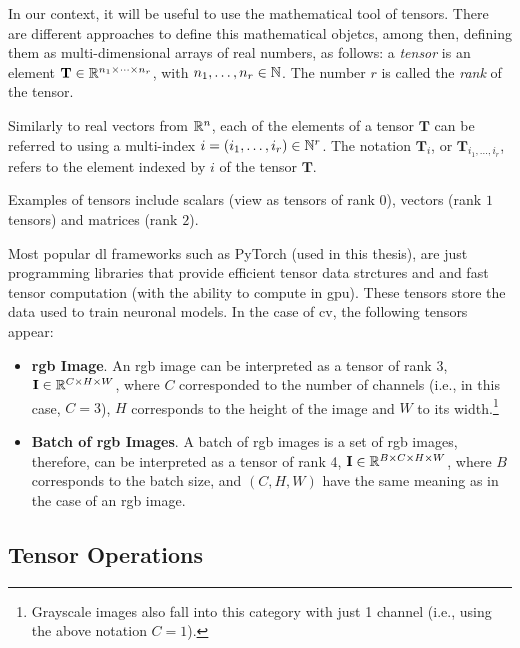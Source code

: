 In our context, it will be useful to use the mathematical tool of
tensors. There are different approaches to define this mathematical objetcs,
among then, defining them as multi-dimensional arrays of real numbers, as
follows: a \emph{tensor} is an element
\(\mathbf{T} \in \mathbb{R}^{n_1 \times \cdots \times n_r}\), with
\(n_1, \ldots, n_r \in \mathbb{N}\). The number \(r\) is called the \emph{rank} of the
tensor.

Similarly to real vectors from \(\mathbb{R}^n\), each of the elements of a tensor
\(\mathbf{T}\) can be referred to using a multi-index
\(i = (i_1, \ldots, i_r) \in \mathbb{N}^r\). The notation \(\mathbf{T}_i\), or
\(\mathbf{T}_{i_1, \ldots, i_r}\), refers to the element indexed by \(i\) of
the tensor \(\mathbf{T}\).

\begin{exampleBox}
  Examples of tensors include scalars (view as tensors of rank \(0\)), vectors
  (rank \(1\) tensors) and matrices (rank \(2\)).
\end{exampleBox}

Most popular \gls{dl} frameworks such as PyTorch (used in this thesis), are
just programming libraries that provide efficient tensor data strctures and and
fast tensor computation (with the ability to compute in \gls{gpu}). These
tensors store the data used to train neuronal models. In the case of \gls{cv},
the following tensors appear:
\begin{itemize}
  \item \textbf{\acs*{rgb} Image}. An \acs{rgb} image can be interpreted as a
  tensor of rank 3, \(\mathbf{I} \in \mathbb{R}^{C \times H \times W}\), where \(C\)
  corresponded to the number of channels (i.e., in this case, \(C = 3\)), \(H\)
  corresponds to the height of the image and \(W\) to its
  width.\footnote{Grayscale images also fall into this category with just 1
    channel (i.e., using the above notation \(C = 1\)).}
  \item \textbf{Batch of \acs*{rgb} Images}. A batch of \acs{rgb} images is a
  set of \acs{rgb} images, therefore, can be interpreted as a tensor of rank 4,
  \(\mathbf{I} \in \mathbb{R}^{B \times C \times H \times W}\), where \(B\) corresponds
  to the batch size, and \((C, H, W)\) have the same meaning as in the case of
  an \acs{rgb} image.
\end{itemize}

\subsection{Tensor Operations}

